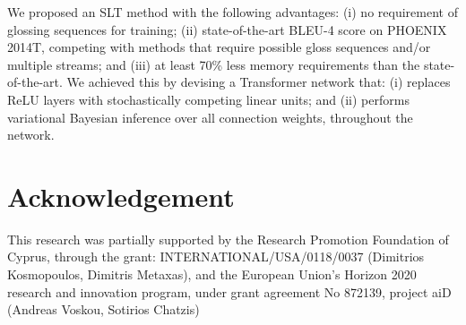\documentclass[10pt,twocolumn,letterpaper]{article}
\begin{document}
We proposed an SLT method with the following advantages:
(i) no requirement of glossing sequences for training; (ii) state-of-the-art BLEU-4 score on PHOENIX 2014T, competing with methods that require possible gloss sequences and/or multiple streams; and (iii) at least 70\% less memory requirements than the state-of-the-art. We achieved this by devising a Transformer network that: (i) replaces ReLU layers with stochastically competing linear units; and (ii) performs variational Bayesian inference over all connection weights, throughout the network. 

\section*{Acknowledgement}

This research was partially supported by the Research Promotion Foundation of Cyprus, through the grant: INTERNATIONAL/USA/0118/0037 (Dimitrios Kosmopoulos, Dimitris Metaxas), and the  European Union’s Horizon 2020 research and innovation program, under grant agreement No 872139, project aiD (Andreas Voskou, Sotirios Chatzis)

\small


\end{document}
